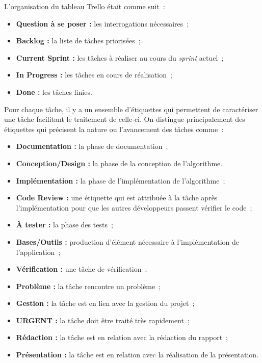 \documentclass[12pt]{article}
\begin{document}
\noindent L'organisation du tableau Trello était comme suit~:
\begin{itemize}[label=\textbullet]
    \item \textbf{Question à se poser :} les interrogations nécessaires~;
    \item \textbf{Backlog :} la liste de tâches priorisées~;
    \item \textbf{Current Sprint :} les tâches à réaliser au cours du \textsl{sprint} actuel~;
    \item \textbf{In Progress :} les tâches en cours de réalisation~;
    \item \textbf{Done :} les tâches finies.
\end{itemize}
Pour chaque tâche, il y a un ensemble d'étiquettes qui permettent de caractériser une tâche facilitant le traitement de celle-ci.
On distingue principalement des étiquettes qui précisent la nature ou l'avancement des tâches comme~:
\begin{itemize}[label=\textbullet]
    \item \textbf{Documentation :} la phase de documentation~;
    \item \textbf{Conception/Design :} la phase de la conception de l'algorithme.
    \item \textbf{Implémentation :} la phase de l'implémentation de l'algorithme~;
    \item \textbf{Code Review :} une étiquette qui est attribuée à la tâche après l'implémentation pour que les autres développeurs passent vérifier le code~;
    \item \textbf{À tester :} la phase des tests~;
    \item \textbf{Bases/Outils :} production d'élément nécessaire à l'implémentation de l'application~;
    \item \textbf{Vérification :} une tâche de vérification~;
    \item \textbf{Problème :} la tâche rencontre un problème~;
    \item \textbf{Gestion :} la tâche est en lien avec la gestion du projet~;
    \item \textbf{URGENT :} la tâche doit être traité très rapidement~;
    \item \textbf{Rédaction :} la tâche est en relation avec la rédaction du rapport~;
    \item \textbf{Présentation :} la tâche est en relation avec la réalisation de la présentation.
\end{itemize}
\end{document}
